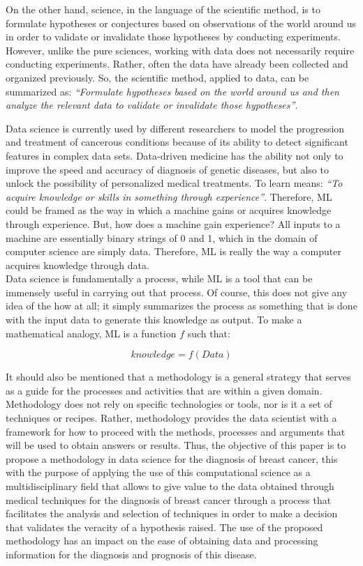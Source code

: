 On the other hand, science, in the language of the scientific method, is to formulate hypotheses or conjectures based on observations of the world around us in order to validate or invalidate those hypotheses by conducting experiments. However, unlike the pure sciences, working with data does not necessarily require conducting experiments. Rather, often the data have already been collected and organized previously. So, the scientific method, applied to data, can be summarized as: \textit{“Formulate hypotheses based on the world around us and then analyze the relevant data to validate or invalidate those hypotheses”}.

Data science is currently used by different researchers to model the progression and treatment of cancerous conditions because of its ability to detect significant features in complex data sets. Data-driven medicine has the ability not only to improve the speed and accuracy of diagnosis of genetic diseases, but also to unlock the possibility of personalized medical treatments\cite{Baker2018}. To learn means: \textit{“To acquire knowledge or skills in something through experience”}. Therefore, ML could be framed as the way in which a machine gains or acquires knowledge through experience. But, how does a machine gain experience? All inputs to a machine are essentially binary strings of 0 and 1, which in the domain of computer science are simply data. Therefore, ML is really the way a computer acquires knowledge through data. \\

Data science is fundamentally a process, while ML is a tool that can be immensely useful in carrying out that process\cite{Pillai2020}. Of course, this does not give any idea of the how at all; it simply summarizes the process as something that is done with the input data to generate this knowledge as output. To make a mathematical analogy, ML is a function $f$ such that:

\begin{equation}
	knowledge = f(Data)
\end{equation}

It should also be mentioned that a methodology is a general strategy that serves as a guide for the processes and activities that are within a given domain. Methodology does not rely on specific technologies or tools, nor is it a set of techniques or recipes. Rather, methodology provides the data scientist with a framework for how to proceed with the methods, processes and arguments that will be used to obtain answers or results\cite{Rollins2015}.
Thus, the objective of this paper is to propose a methodology in data science for the diagnosis of breast cancer, this with the purpose of applying the use of this computational science as a multidisciplinary field that allows to give value to the data obtained through medical techniques for the diagnosis of breast cancer through a process that facilitates the analysis and selection of techniques in order to make a decision that validates the veracity of a hypothesis raised. The use of the proposed methodology has an impact on the ease of obtaining data and processing information for the diagnosis and prognosis of this disease.
